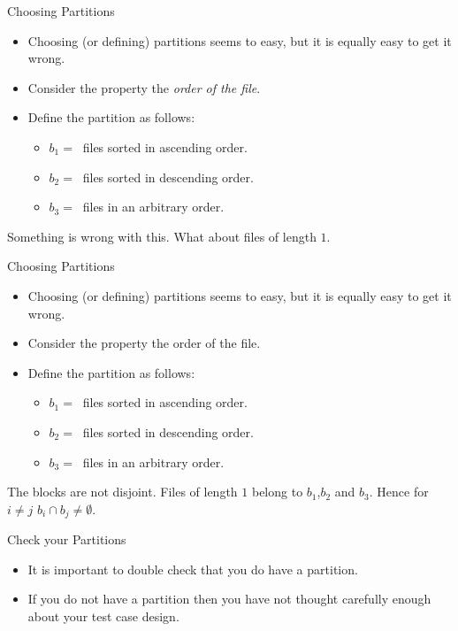 \documentclass{beamer}
\begin{document}
\begin{frame}{Choosing Partitions}
  \begin{itemize}
  \item Choosing (or defining) partitions seems to easy, but it is
    equally easy to get it wrong.
  \item Consider the property the {\it order of the file}.
  \item Define the partition as follows:
    \begin{itemize}
    \item $b_1 = \ $ files sorted in ascending order.
    \item $b_2 = \ $ files sorted in descending order.
    \item $b_3 = \ $ files in an arbitrary order.
    \end{itemize}
  \end{itemize}
  Something is wrong with this. What about files of length $1$.
\end{frame}
\begin{frame}{Choosing Partitions}
  \begin{itemize}
  \item Choosing (or defining) partitions seems to easy, but it is
    equally easy to get it wrong.
  \item Consider the property the order of the file.
  \item Define the partition as follows:
    \begin{itemize}
    \item $b_1 = \ $ files sorted in ascending order.
    \item $b_2 = \ $ files sorted in descending order.
    \item $b_3 = \ $ files in an arbitrary order.
    \end{itemize}
  \end{itemize}
 The blocks are not disjoint. Files of length $1$ belong to
 $b_1$,$b_2$ and $b_3$. Hence for $i\neq j$ $b_i \cap b_j \neq \emptyset$.

\end{frame}
\begin{frame}{Check your Partitions}

  \begin{itemize}
  \item   It is important to double check that you do have a
    partition.
    \item If you  do not have a partition then you have not thought
      carefully enough about your test case design.
  \end{itemize}

  
\end{frame}
\end{document}
